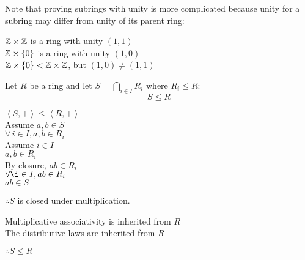 \documentclass[letterpaper,12pt,fleqn]{article}
\newcommand{\group}[2]{\left<#1,#2\right>}
\begin{document}
Note that proving subrings with unity is more complicated because unity for a subring may
differ from unity of its parent ring:

$\mathbb{Z}\times\mathbb{Z}$ is a ring with unity $(1,1)$ \\
$\mathbb{Z}\times\{0\}$ is a ring with unity $(1,0)$ \\
$\mathbb{Z}\times\{0\}<\mathbb{Z}\times\mathbb{Z}$, but $(1,0)\ne(1,1)$

\begin{theorem}
  Let $R$ be a ring and let $S=\bigcap_{i\in I}R_i$ where $R_i\le R$:
  \[S\le R\]
\end{theorem}

\begin{theproof}
  $\group{S}{+}\le\group{R}{+}$ \\
  Assume $a,b\in S$ \\
  $\forall\,i\in I,a,b\in R_i$ \\
  Assume $i\in I$ \\
  $a,b\in R_i$ \\
  By closure, $ab\in R_i$ \\
  $\forall\i\in I,ab\in R_i$ \\
  $ab\in S$

  $\therefore S$ is closed under multiplication.

  Multiplicative associativity is inherited from $R$ \\
  The distributive laws are inherited from $R$

  $\therefore S\le R$
\end{theproof}
\end{document}
